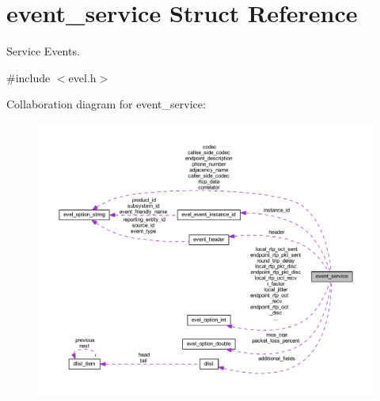 \hypertarget{structevent__service}{}\section{event\+\_\+service Struct Reference}
\label{structevent__service}


Service Events.  




{\ttfamily \#include $<$evel.\+h$>$}



Collaboration diagram for event\+\_\+service\+:
\nopagebreak
\begin{figure}[H]
\begin{center}
\leavevmode
\includegraphics[width=350pt]{structevent__service__coll__graph}
\end{center}
\end{figure}
